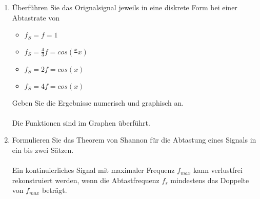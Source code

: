 \documentclass[a4paper]{article}
\begin{document}
\begin{enumerate}[label=\alph*)]
    \item Überführen Sie das Orignalsignal jeweils in eine diskrete Form bei einer Abtastrate von
    \begin{itemize}
        \item $f_S=f=1$
        \item $f_S=\frac{4}{3}f=cos(\frac{x}{}x)$
        \item $f_S=2f=cos(x)$
        \item $f_S=4f=cos(x)$
    \end{itemize}
    Geben Sie die Ergebnisse numerisch und graphisch an.\\\\
    Die Funktionen sind im Graphen überführt.\\
    \item Formulieren Sie das Theorem von Shannon für die Abtastung eines Signals in ein bis zwei Sätzen.\\\\
    Ein kontinuierliches Signal mit maximaler Frequenz $f_{max}$ kann verlustfrei rekonstruiert werden, wenn die Abtastfrequenz $f_s$ mindestens das Doppelte von $f_{max}$ beträgt.
\end{enumerate}
\end{document}
